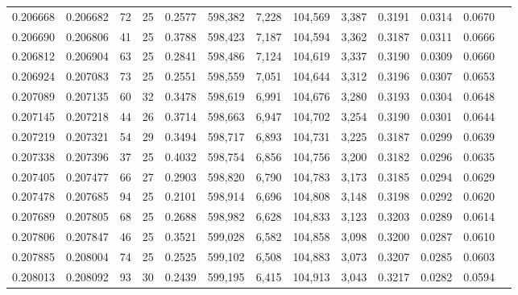 \begin{tabular}{rrrrrrrrrrrrr}
0.206668 & 0.206682 &    72 &  25 &                                     0.2577 & 598,382 &   7,228 & 104,569 &   3,387 & 0.3191 & 0.0314 & 0.0670 \\
0.206690 & 0.206806 &    41 &  25 &                                     0.3788 & 598,423 &   7,187 & 104,594 &   3,362 & 0.3187 & 0.0311 & 0.0666 \\
0.206812 & 0.206904 &    63 &  25 &                                     0.2841 & 598,486 &   7,124 & 104,619 &   3,337 & 0.3190 & 0.0309 & 0.0660 \\
0.206924 & 0.207083 &    73 &  25 &                                     0.2551 & 598,559 &   7,051 & 104,644 &   3,312 & 0.3196 & 0.0307 & 0.0653 \\
0.207089 & 0.207135 &    60 &  32 &                                     0.3478 & 598,619 &   6,991 & 104,676 &   3,280 & 0.3193 & 0.0304 & 0.0648 \\
0.207145 & 0.207218 &    44 &  26 &                                     0.3714 & 598,663 &   6,947 & 104,702 &   3,254 & 0.3190 & 0.0301 & 0.0644 \\
0.207219 & 0.207321 &    54 &  29 &                                     0.3494 & 598,717 &   6,893 & 104,731 &   3,225 & 0.3187 & 0.0299 & 0.0639 \\
0.207338 & 0.207396 &    37 &  25 &                                     0.4032 & 598,754 &   6,856 & 104,756 &   3,200 & 0.3182 & 0.0296 & 0.0635 \\
0.207405 & 0.207477 &    66 &  27 &                                     0.2903 & 598,820 &   6,790 & 104,783 &   3,173 & 0.3185 & 0.0294 & 0.0629 \\
0.207478 & 0.207685 &    94 &  25 &                                     0.2101 & 598,914 &   6,696 & 104,808 &   3,148 & 0.3198 & 0.0292 & 0.0620 \\
0.207689 & 0.207805 &    68 &  25 &                                     0.2688 & 598,982 &   6,628 & 104,833 &   3,123 & 0.3203 & 0.0289 & 0.0614 \\
0.207806 & 0.207847 &    46 &  25 &                                     0.3521 & 599,028 &   6,582 & 104,858 &   3,098 & 0.3200 & 0.0287 & 0.0610 \\
0.207885 & 0.208004 &    74 &  25 &                                     0.2525 & 599,102 &   6,508 & 104,883 &   3,073 & 0.3207 & 0.0285 & 0.0603 \\
0.208013 & 0.208092 &    93 &  30 &                                     0.2439 & 599,195 &   6,415 & 104,913 &   3,043 & 0.3217 & 0.0282 & 0.0594 \\

\end{tabular}
